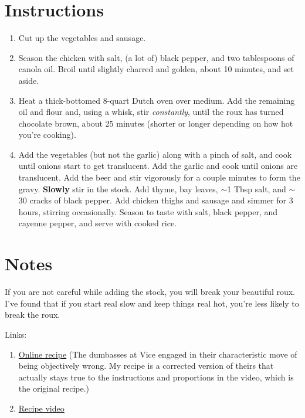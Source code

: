 \documentclass[11pt]{article}
\begin{document}
	\section*{Instructions}
	\begin{enumerate}
		\item Cut up the vegetables and sausage.
		\item Season the chicken with salt, (a lot of) black pepper, and two tablespoons of canola oil. Broil until slightly charred and golden, about 10 minutes, and set aside.
		\item Heat a thick-bottomed 8-quart Dutch oven over medium. Add the remaining oil and flour and, using a whisk, stir \textit{constantly}, until the roux has turned chocolate brown, about 25 minutes (shorter or longer depending on how hot you're cooking).
		\item Add the vegetables (but not the garlic) along with a pinch of salt, and cook until onions start to get translucent. Add the garlic and cook until onions are translucent. Add the beer and stir vigorously for a couple minutes to form the gravy. \textbf{Slowly} stir in the stock. Add thyme, bay leaves, $\sim$1 Tbsp salt, and $\sim$30 cracks of black pepper. Add chicken thighs and sausage and simmer for 3 hours, stirring occasionally. Season to taste with salt, black pepper, and cayenne pepper, and serve with cooked rice.
	\end{enumerate}
	
	\section*{Notes}
	If you are not careful while adding the stock, you will break your beautiful roux. I've found that if you start real slow and keep things real hot, you're less likely to break the roux.
	
	Links:
	\begin{enumerate}
		\item \href{https://www.vice.com/en/article/z489zy/chicken-and-andouille-sausage-gumbo}{Online recipe} (The dumbasses at Vice engaged in their characteristic move of being objectively wrong. My recipe is a corrected version of theirs that actually stays true to the instructions and proportions in the video, which is the original recipe.)
		\item \href{https://www.youtube.com/watch?v=76JXtB7JFQY}{Recipe video} 
	\end{enumerate}
	
\end{document}
